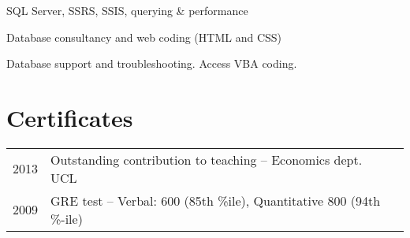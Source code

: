 \documentclass[a4paper,nomath]{deedy-resume} %
\begin{document}
\begin{paracol}{2}


    \begin{tightitemize}
        \item SQL Server, SSRS, SSIS, querying \& performance
    \end{tightitemize}

    \sectionspace %
    


    \begin{tightitemize}
        \item Database consultancy and web coding (HTML and CSS)
    \end{tightitemize}

    \sectionspace %
    


    \begin{tightitemize}
        \item Database support and troubleshooting. Access VBA coding.
    \end{tightitemize}

    \sectionspace %

    \section{Certificates} 

    \begin{tabular}{rll}
        2013     & Outstanding contribution to teaching -- Economics dept. UCL\\
        2009     & GRE test -- Verbal: 600 (85th \%ile), Quantitative 800 (94th \%-ile) \\
    \end{tabular}


\end{paracol}
\end{document}

